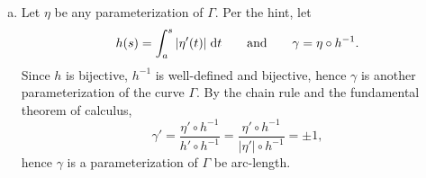 \begin{exrc}[1]
\begin{soln}
\begin{enumerate}[(a)]
    \item
        Let \(\eta\) be any parameterization of \(\Gamma\).
        Per the hint, let
        \begin{equation*}
            h(s) = \int_{a}^{s} |\eta'(t)| \;\mathrm d t
            \quad \quad \text{and} \quad \quad
            \gamma = \eta \circ h^{-1}.
        \end{equation*}
        Since \(h\) is bijective, \(h^{-1}\) is well-defined and bijective,
        hence \(\gamma\) is another parameterization of the curve \(\Gamma\).
        By the chain rule and the fundamental theorem of calculus,
        \begin{equation*}
            \gamma' = \frac{\eta' \circ h^{-1}}{h' \circ h^{-1}}
            = \frac{\eta' \circ h^{-1}}{|\eta'| \circ h^{-1}}
            = \pm 1,
        \end{equation*}
        hence \(\gamma\) is a parameterization of \(\Gamma\) be arc-length.






    \end{enumerate}

\end{soln}
\end{exrc}
